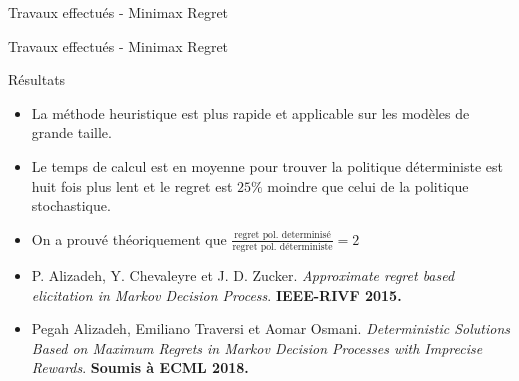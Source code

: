 \documentclass{beamer}
\begin{document}
{{\begin{frame}{Travaux effectués - Minimax Regret }
\end{frame}

\begin{frame}{Travaux effectués - Minimax Regret }

\begin{block}{Résultats}
\begin{itemize}
\item La méthode heuristique est plus rapide et applicable sur les modèles de grande taille.
\item Le temps de calcul est en moyenne  pour trouver la politique déterministe est huit  fois plus lent et  le regret est $25 \%$ moindre que celui de la politique stochastique.  
\item On a prouvé théoriquement que 
	$\frac{\text{regret pol. determinisé}}{\text{regret pol. déterministe}} = 2 $
\end{itemize}
\end{block}

\begin{itemize}
\small
\item  P. Alizadeh, Y. Chevaleyre et J. D. Zucker. \textit{Approximate regret based elicitation in Markov Decision Process}. \textbf{IEEE-RIVF 2015.} 
\item Pegah Alizadeh, Emiliano Traversi et Aomar Osmani. \textit{Deterministic Solutions Based on Maximum Regrets in Markov Decision Processes with Imprecise Rewards}. \textbf{Soumis à ECML 2018.}
\end{itemize}

\end{frame}



%
%
%
%
%

}}
\end{document}
